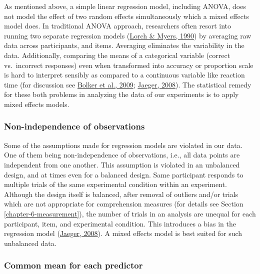 \documentclass[a4paper, nobind]{templates/ociamthesis}
\begin{document}
As mentioned above, a simple linear regression model, including ANOVA, does not model the effect of two random effects simultaneously which a mixed effects model does.
In traditional ANOVA approach, researchers often resort into running two separate regression models (\protect\hyperlink{ref-Lorch1990}{Lorch \& Myers, 1990}) by averaging raw data across participants, and items.
Averaging eliminates the variability in the data.
Additionally, comparing the means of a categorical variable (correct vs.~incorrect responses) even when transformed into accuracy or proportion scale is hard to interpret sensibly as compared to a continuous variable like reaction time (for discussion see \protect\hyperlink{ref-Bolker2009}{Bolker et al., 2009}; \protect\hyperlink{ref-Jaeger2008}{Jaeger, 2008}).
The statistical remedy for these both problems in analyzing the data of our experiments is to apply mixed effects models.

\hypertarget{non-independence-of-observations}{%
\subsubsection{Non-independence of observations}\label{non-independence-of-observations}}

Some of the assumptions made for regression models are violated in our data.
One of them being non-independence of observations, i.e., all data points are independent from one another.
This assumption is violated in an unbalanced design, and at times even for a balanced design.
Same participant responds to multiple trials of the same experimental condition within an experiment.
Although the design itself is balanced, after removal of outliers and/or trials which are not appropriate for comprehension measures (for details see Section \ref{chapter-6-measurement}),
the number of trials in an analysis are unequal for each participant, item, and experimental condition.
This introduces a bias in the regression model (\protect\hyperlink{ref-Jaeger2008}{Jaeger, 2008}).
A mixed effects model is best suited for such unbalanced data.

\hypertarget{common-mean-for-each-predictor}{%
\subsubsection{Common mean for each predictor}\label{common-mean-for-each-predictor}}
\end{document}
